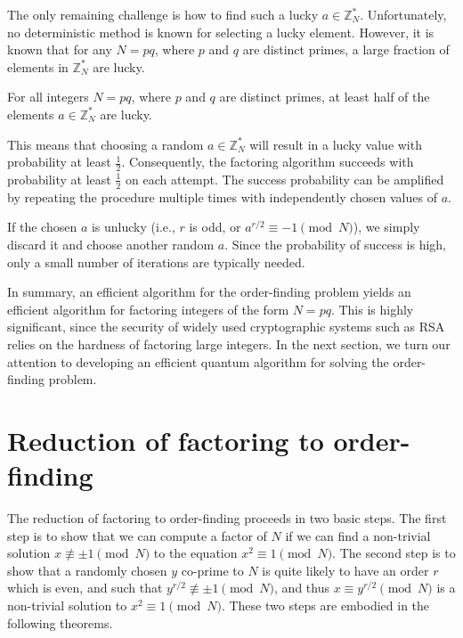 The only remaining challenge is how to find such a lucky $a \in \mathbb{Z}_N^*$. Unfortunately, no deterministic method is known for selecting a lucky element. However, it is known that for any $N = pq$, where $p$ and $q$ are distinct primes, a large fraction of elements in $\mathbb{Z}_N^*$ are lucky.

\begin{lemma}
    For all integers $N = pq$, where $p$ and $q$ are distinct primes, at least half of the elements $a \in \mathbb{Z}_N^*$ are lucky.
\end{lemma}

This means that choosing a random $a \in \mathbb{Z}_N^*$ will result in a lucky value with probability at least $\frac{1}{2}$. Consequently, the factoring algorithm succeeds with probability at least $\frac{1}{2}$ on each attempt. The success probability can be amplified by repeating the procedure multiple times with independently chosen values of $a$.

If the chosen $a$ is unlucky (i.e., $r$ is odd, or $a^{r/2} \equiv -1 \pmod{N}$), we simply discard it and choose another random $a$. Since the probability of success is high, only a small number of iterations are typically needed.

In summary, an efficient algorithm for the order-finding problem yields an efficient algorithm for factoring integers of the form $N = pq$. This is highly significant, since the security of widely used cryptographic systems such as RSA relies on the hardness of factoring large integers. In the next section, we turn our attention to developing an efficient quantum algorithm for solving the order-finding problem.


\section{Reduction of factoring to order-finding}

The reduction of factoring to order-finding proceeds in two basic steps. The first step is to show that we can compute a factor of $N$ if we can find a non-trivial solution $x \not\equiv \pm 1 \pmod{N}$ to the equation $x^2 \equiv 1 \pmod{N}$. The second step is to show that a randomly chosen $y$ co-prime to $N$ is quite likely to have an order $r$ which is even, and such that $y^{r/2} \not\equiv \pm 1 \pmod{N}$, and thus $x \equiv y^{r/2} \pmod{N}$ is a non-trivial solution to $x^2 \equiv 1 \pmod{N}$. These two steps are embodied in the following theorems.


